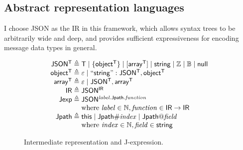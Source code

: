 \subsection{Abstract representation languages}
\label{sec:shrink-ir}
I choose JSON as the IR in this framework, which allows syntax trees to be
arbitrarily wide and deep, and provides sufficient expressiveness for encoding
message data types in general.

\begin{figure}
\[\begin{array}{r@{\;}l}
\mathsf{JSON^T}\triangleq&\mathsf T\mid\{\mathsf{object^T}\}\mid[\mathsf{array^T}]\mid\mathsf{string}\mid\Int\mid\Bool\mid\mathsf{null}\\
\mathsf{object^T}\triangleq&\nil\mid\mathsf{``string": JSON^T,object^T}\\
\mathsf{array^T}\triangleq&\nil\mid\mathsf{JSON^T,array^T}\\
\mathsf{IR}\triangleq&\mathsf{JSON^{IR}}\\
\mathsf{Jexp}\triangleq&\mathsf{JSON^{\Jref{\Label}{\Jpath}{\Function}}}\\
&\text{where }\Label\in\Nat,\Function\in\mathsf{IR}\to\mathsf{IR}\\
\Jpath\triangleq&\This\mid\Jpath\Number\Index\mid\Jpath\At\Field\\
&\text{where }\Index\in\Nat,\Field\in\mathsf{string}
\end{array}\]
\caption{Intermediate representation and J-expression.}
\label{fig:ir-jexp}
\end{figure}

